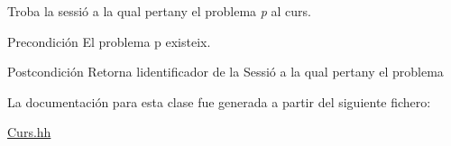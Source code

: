 Troba la sessió a la qual pertany el problema {\itshape p} al curs. 

\begin{DoxyPrecond}{Precondición}
El problema p existeix. 
\end{DoxyPrecond}
\begin{DoxyPostcond}{Postcondición}
Retorna l\textquotesingle{}identificador de la Sessió a la qual pertany el problema 
\end{DoxyPostcond}


La documentación para esta clase fue generada a partir del siguiente fichero\+:\begin{DoxyCompactItemize}
\item 
\mbox{\hyperlink{_curs_8hh}{Curs.\+hh}}\end{DoxyCompactItemize}

